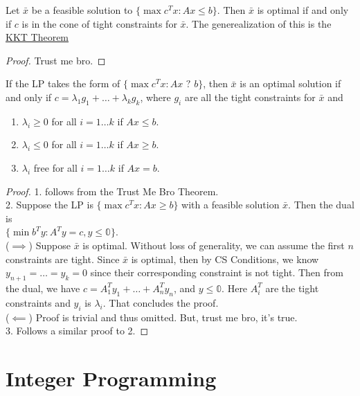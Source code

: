 \documentclass[a4paper]{report}
\begin{document}
\begin{theorem}
  Let $\bar x$ be a feasible solution to $\{\max c^T x : Ax \leq b\}$. Then $\bar x$ is optimal if and only if $c$ is in the cone of tight constraints for $\bar x$. The generealization of this is the \hyperref[kkt]{KKT Theorem}
\end{theorem}
\begin{proof}
    Trust me bro. 
\end{proof}
\begin{corollary}
  If the LP takes the form of $\{\max c^T x : Ax \text{ ? } b\}$, then $\bar x$ is an optimal solution if and only if $c = \lambda_1 g_1 + \dots + \lambda_k g_k$, where $g_i$ are all the tight constraints for $\bar x$ and 
  \begin{enumerate}
    \item $\lambda_i \geq 0$ for all $i = 1 \dots k$ if $Ax \leq b$.
    \item $\lambda_i \leq 0$ for all $i = 1 \dots k$ if $Ax \geq b$.
    \item $\lambda_i$ free for all $i = 1 \dots k$ if $Ax = b$.
  \end{enumerate}
\end{corollary}
\begin{proof}
  1. follows from the Trust Me Bro Theorem. \\[0.3in]
  2. Suppose the LP is $\{\max c^T x : Ax \geq b\}$ with a feasible solution $\bar x$. Then the dual is \\ $\{\min b^T y : A^T y = c, y \leq \mathbb 0\}$.\\[0.15in]
($\implies$) Suppose $\bar x$ is optimal. Without loss of generality, we can assume the first $n$ constraints are tight. Since $\bar x$ is optimal, then by CS Conditions, we know $y_{n+1} = \dots = y_k = 0$ since their corresponding constraint is not tight. Then from the dual, we have $c = A^T_1 y_1 + \dots + A^T_n y_n$, and $y \leq \mathbb 0$. Here $A^T_i$ are the tight constraints and $y_i$ is $\lambda_i$. That concludes the proof.\\[0.15in]
  ($\impliedby$) Proof is trivial and thus omitted. But, trust me bro, it's true. \\[0.3in]
  3. Follows a similar proof to 2.
\end{proof}

\chapter{Integer Programming}
\end{document}

